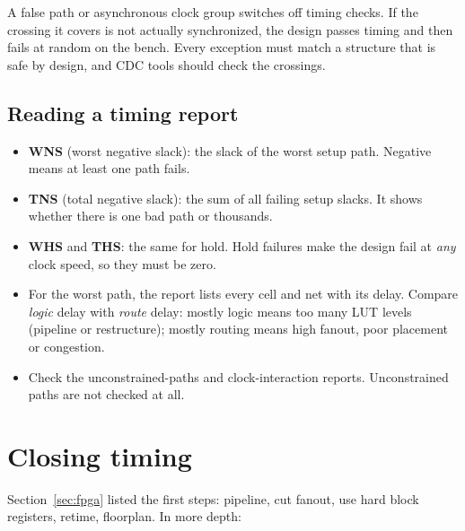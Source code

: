 \begin{trap}
A false path or asynchronous clock group switches off timing checks. If the crossing it covers is not actually synchronized, the design passes timing and then fails at random on the bench. Every exception must match a structure that is safe by design, and CDC tools should check the crossings.
\end{trap}

\subsection*{Reading a timing report}

\begin{itemize}
  \item \textbf{WNS} (worst negative slack): the slack of the worst setup path. Negative means at least one path fails.
  \item \textbf{TNS} (total negative slack): the sum of all failing setup slacks. It shows whether there is one bad path or thousands.
  \item \textbf{WHS} and \textbf{THS}: the same for hold. Hold failures make the design fail at \emph{any} clock speed, so they must be zero.
  \item For the worst path, the report lists every cell and net with its delay. Compare \emph{logic} delay with \emph{route} delay: mostly logic means too many LUT levels (pipeline or restructure); mostly routing means high fanout, poor placement or congestion.
  \item Check the unconstrained-paths and clock-interaction reports. Unconstrained paths are not checked at all.
\end{itemize}

\section{Closing timing}

Section~\ref{sec:fpga} listed the first steps: pipeline, cut fanout, use hard block registers, retime, floorplan. In more depth:

